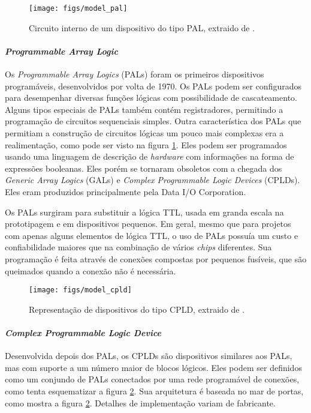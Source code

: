 \documentclass[11pt,a4paper,oneside]{book}
\begin{document}
\begin{figure}[h]
\centering
\texttt{[image: figs/model\_pal]}
\caption{Circuito interno de um dispositivo do tipo PAL, extraido de \cite{Ashenden2008}.}
\label{fig:pal}
\end{figure}

\paragraph{\textit{Programmable Array Logic}}
Os \textit{Programmable Array Logics} (PALs) foram os primeiros dispositivos program\'aveis, desenvolvidos por volta de 1970.
Os PALs podem ser configurados para desempenhar diversas fun\c{c}\~oes l\'ogicas com possibilidade de cascateamento.
Alguns tipos especiais de PALs tamb\'em cont\'em registradores, permitindo a programa\c{c}\~ao de circuitos sequenciais simples.
Outra caracter\'i­stica dos PALs que permitiam a constru\c{c}\~ao de circuitos l\'ogicas um pouco mais complexas era a realimenta\c{c}\~ao, como pode ser visto na figura \ref{fig:pal}.
Eles podem ser programados usando uma linguagem de descri\c{c}\~ao de \textit{hardware} com informa\c{c}\~oes na forma de express\~oes booleanas.
Eles por\'em se tornaram obsoletos com a chegada dos \textit{Generic Array Logics} (GALs) e \textit{Complex Programmable Logic Devices} (CPLDs).
Eles eram produzidos principalmente pela Data I/O Corporation.

Os PALs surgiram para substituir a l\'ogica TTL, usada em granda escala na prototipagem e em dispositivos pequenos.
Em geral, mesmo que para projetos com apenas alguns elementos de l\'ogica TTL, o uso de PALs possu\'i­a um custo e confiabilidade maiores que na combina\c{c}\~ao de v\'arios \textit{chips} diferentes.
Sua programa\c{c}\~ao \'e feita atrav\'es de conex\~oes compostas por pequenos fus\'i­veis, que s\~ao queimados quando a conex\~ao n\~ao \'e necess\'aria.

\begin{figure}[h]
\centering
\texttt{[image: figs/model\_cpld]}
\caption{Representa\c{c}\~ao de dispositivos do tipo CPLD, extraido de \cite{Ashenden2008}.}
\label{fig:cpld}
\end{figure}

\paragraph{\textit{Complex Programmable Logic Device}}
Desenvolvida depois dos PALs, os CPLDs s\~ao dispositivos similares aos PALs, mas com suporte a um n\'umero maior de blocos l\'ogicos.
Eles podem ser definidos como um conjundo de PALs conectados por uma rede program\'avel de conex\~oes, como tenta esquematizar a figura \ref{fig:cpld}.
Sua arquitetura \'e baseada no mar de portas, como mostra a figura \ref{fig:cpld}.
Detalhes de implementa\c{c}\~ao variam de fabricante.
\end{document}
